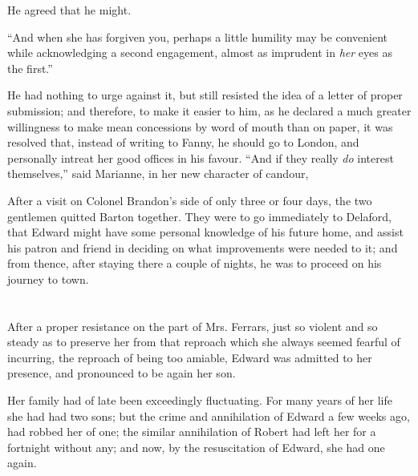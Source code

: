 He agreed that he might.

“And when she has forgiven you, perhaps a little humility may be convenient while acknowledging a second engagement, almost as imprudent in {\em her} eyes as the first.”

He had nothing to urge against it, but still resisted the idea of a letter of proper submission; and therefore, to make it easier to him, as he declared a much greater willingness to make mean concessions by word of mouth than on paper, it was resolved that, instead of writing to Fanny, he should go to London, and personally intreat her good offices in his favour. “And if they really {\em do} interest themselves,” said Marianne, in her new character of candour, 

After a visit on Colonel Brandon's side of only three or four days, the two gentlemen quitted Barton together. They were to go immediately to Delaford, that Edward might have some personal knowledge of his future home, and assist his patron and friend in deciding on what improvements were needed to it; and from thence, after staying there a couple of nights, he was to proceed on his journey to town.

\chapter{} %

After a proper resistance on the part of Mrs. Ferrars, just so violent and so steady as to preserve her from that reproach which she always seemed fearful of incurring, the reproach of being too amiable, Edward was admitted to her presence, and pronounced to be again her son.

Her family had of late been exceedingly fluctuating. For many years of her life she had had two sons; but the crime and annihilation of Edward a few weeks ago, had robbed her of one; the similar annihilation of Robert had left her for a fortnight without any; and now, by the resuscitation of Edward, she had one again.

